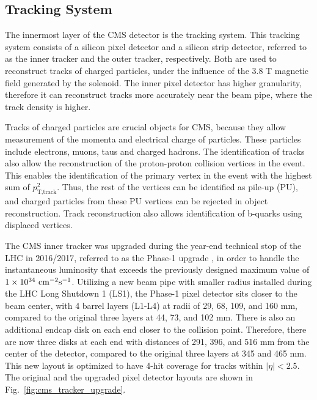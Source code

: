 \subsection{Tracking System}

The innermost layer of the CMS detector is the tracking system. This tracking system consists of a silicon pixel detector and a silicon strip detector, 
referred to as the inner tracker and the outer tracker, respectively. Both are used to reconstruct tracks of charged particles, under the influence of
the 3.8 T magnetic field generated by the solenoid. The inner pixel detector has higher granularity, therefore it can reconstruct tracks more accurately near
the beam pipe, where the track density is higher.

Tracks of charged particles are crucial objects for CMS, because they allow measurement of the momenta and electrical charge of particles. These particles include
electrons, muons, taus and charged hadrons. The identification of tracks also allow the reconstruction of the proton-proton collision vertices in the event. This enables
the identification of the primary vertex in the event with the highest sum of $p_{\textrm{T,track}}^{2}$. Thus, the rest of the vertices can be identified as pile-up (PU),
and charged particles from these PU vertices can be rejected in object reconstruction. Track reconstruction also allows identification of b-quarks using displaced
vertices. 

The CMS inner tracker was upgraded during the year-end technical stop of the LHC in 2016/2017, referred to as the Phase-1 upgrade \cite{cms:tracker_upgrade},
in order to handle the instantaneous luminosity that exceeds the previously designed maximum value of $1 \times 10^{34} \ \lumiunit$. Utilizing a new 
beam pipe with smaller radius installed during the LHC Long Shutdown 1 (LS1), the Phase-1 pixel detector sits closer to the beam center, with 4 barrel layers 
(L1-L4) at radii of 29, 68, 109, and 160 mm, compared to the original three layers at 44, 73, and 102 mm. There is also an additional endcap disk on each end 
closer to the collision point. Therefore, there are now three disks at each end with distances of 291, 396, and 516 mm from the center of the detector, compared 
to the original three layers at 345 and 465 mm. This new layout is optimized to have 4-hit coverage for tracks within $|\eta| < 2.5$. The original and the upgraded
pixel detector layouts are shown in Fig.~\ref{fig:cms_tracker_upgrade}.

